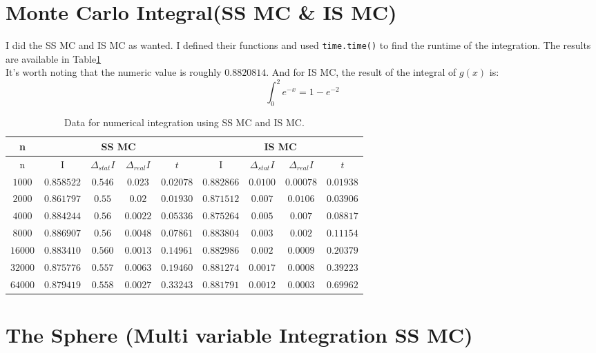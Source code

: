 \documentclass[12pt]{article}
\begin{document}
	\section{Monte Carlo Integral(SS MC \& IS MC)}
	I did the SS MC and IS MC as wanted. I defined their functions and used \texttt{time.time()} to find the 
	runtime of the integration. The results are available in Table\ref{tab:MC}\\
	It's worth noting that the numeric value is roughly $0.8820814$. And for IS MC, the result of the integral of $g(x)$ is:\\
	\begin{equation}
		\int_0^2 e^{-x} = 1 - e^{-2}
	\end{equation}
	\begin{table}[h!]
		\centering
		\begin{tabular}{|c|c|c|c|c||c|c|c|c|}
			\hline
			n & \multicolumn{4}{|c||}{SS MC} & \multicolumn{4}{|c|}{IS MC} \\
			\hline
			n & I & $\Delta_{stat} I$ & $\Delta_{real} I$ & $t$ & I & $\Delta_{stat} I$ & $\Delta_{real} I$ & $t$ \\
			\hline
 			$1000$ & $0.858522$ & $0.546$ & $0.023$ & $0.02078$ & $0.882866$ & $0.0100$ & $0.00078$ & $0.01938$ \\
 			\hline
			 $2000$ & $0.861797$ & $0.55$ & $0.02$ & $0.01930$ & $0.871512$ & $0.007$ & $0.0106$ & $0.03906$ \\
			 \hline
			 $4000$ & $0.884244$ & $0.56$ & $0.0022$ & $0.05336$ & $0.875264$ & $0.005$ & $0.007$ & $0.08817$ \\
			 \hline
			 $8000$ & $0.886907$ & $0.56$ & $0.0048$ & $0.07861$ & $0.883804$ & $0.003$ & $0.002$ & $0.11154$ \\
			 \hline
			 $16000$ & $0.883410$ & $0.560$ & $0.0013$ & $0.14961$ & $0.882986$ & $0.002$ & $0.0009$ & $0.20379$ \\
			 \hline
			 $32000$ & $0.875776$ & $0.557$ & $0.0063$ & $0.19460$ & $0.881274$ & $0.0017$ & $0.0008$ & $0.39223$ \\
			 \hline
			 $64000$ & $0.879419$ & $0.558$ & $0.0027$ & $0.33243$ & $0.881791$ & $0.0012$ & $0.0003$ & $0.69962$ \\
			 \hline
		\end{tabular}
	\label{tab:MC}
	\caption{Data for numerical integration using SS MC and IS MC.}	
	\end{table}
	\section{The Sphere (Multi variable Integration SS MC)}
	
\end{document}

